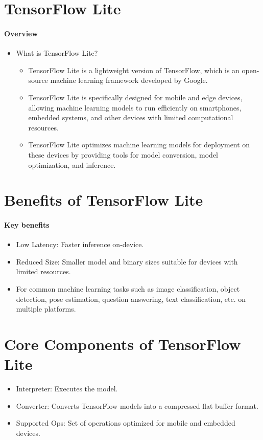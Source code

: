 %
%
%
%



\section{TensorFlow Lite}

{ 
	
  \framesubtitle{Overview}
\begin{itemize}
	\item What is TensorFlow Lite?
	\begin{itemize}
		\item TensorFlow Lite is a lightweight version of TensorFlow, which is an open-source machine learning framework developed by Google. 
		\item TensorFlow Lite is specifically designed for mobile and edge devices, allowing machine learning models to run efficiently on smartphones, embedded systems, and other devices with limited computational resources.
		\item TensorFlow Lite optimizes machine learning models for deployment on these devices by providing tools for model conversion, model optimization, and inference.
	\end{itemize}
\end{itemize}
}

\section{Benefits of TensorFlow Lite}
{ 
	\framesubtitle{Key benefits}	
		\begin{itemize}
			\item Low Latency: Faster inference on-device.
			\item Reduced Size: Smaller model and binary sizes suitable for devices with limited resources.
			\item For common machine learning tasks such as image classification, object detection, pose estimation, question answering, text classification, etc. on multiple platforms.
		\end{itemize}
}

\section{Core Components of TensorFlow Lite}
{ 
\begin{itemize}
	\item Interpreter: Executes the model.
	\item Converter: Converts TensorFlow models into a compressed flat buffer format.
	\item Supported Ops: Set of operations optimized for mobile and embedded devices.
\end{itemize}
}

